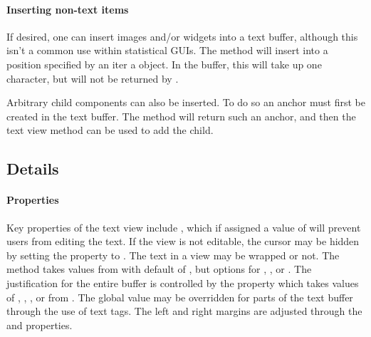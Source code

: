 
\paragraph{Inserting non-text items}
If desired, one can insert images and/or widgets into a text buffer,
although this isn't a common use within statistical GUIs. The method
 will insert into a position
specified by an iter a  object. In the buffer, this
will take up one character, but will not be returned by
. 

Arbitrary child components can also be inserted. To do so an anchor
must first be created in the text buffer. The method
 will return such an anchor, and
then the text view method  can
be used to add the child.


\subsection{ Details}
\label{sec:RGtk2:text-buffers}

\paragraph{Properties}
Key properties of the text view include , which if assigned
a value of  will prevent users from editing the text. 
If the view is not editable, the cursor may be hidden by setting the
 property to . 
The text in a view may be wrapped or not. The method 
takes values from  with default of , but
options for , , or . The
justification for the entire buffer is controlled by the
 property which takes values of ,
, , or  from .
The global value may be overridden for parts of the text buffer
through the use of text tags. The left and right margins are adjusted
through the  and  properties. 


